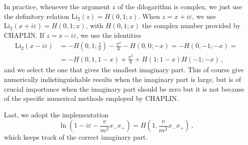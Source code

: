 \documentclass[12pt,a4wide]{article}
\begin{document}
In practice, whenever the argument $z$ of the dilogarithm is complex, we just use the
definitory relation $\mathrm{Li_2}(z)=H(0,1;z)$. When $z=x+i\varepsilon$, we use $\mathrm{Li_2}(x+i\varepsilon)=H(0,1;x)$, with $H(0,1;x)$ the complex number provided by CHAPLIN. If $z=x-i\varepsilon$, we use the identities
\begin{equation}
  \begin{split}
\mathrm{Li}_{2}\left ( x-i\varepsilon \right )&= -H\left(0,1;\frac{1}{x} \right ) - \frac{\pi^2}{6} - H(0,0; -x)  = -H(0,-1;-x) = \\ & 
= -H\left (0,1, 1-x \right )+ \frac{\pi^2}{6} + H(1;1-x) H(-1;-x)\,,
  \end{split}
\end{equation}
and we select the one that gives the smallest imaginary part. This of course give numerically indistinguishable results when the imaginary part is large, but is of
crucial importance when the imaginary part should be zero but it is
not because of the specific numerical methods employed by CHAPLIN.

Last, we adopt the implementation 
\begin{equation}
  \label{eq:log-implemented}
  \ln\left ( 1 - i \varepsilon - \frac{v}{m^2}x_-x_+ \right ) =H\left(1,\frac{v}{m^2}x_-x_+\right)\,,
\end{equation}
which keeps track of the correct imaginary part.

 



\end{document}
